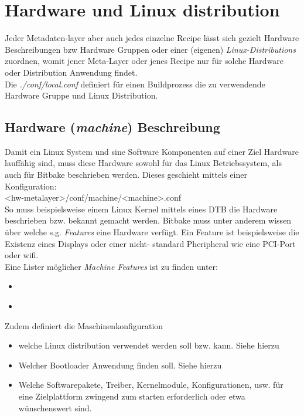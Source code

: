 

\chapter{Hardware und Linux distribution}%
\label{sec:hardware_und_linux_distribution}

Jeder Metadaten-layer aber auch jedes einzelne Recipe lässt sich gezielt
Hardware Beschreibungen bzw Hardware Gruppen oder einer (eigenen)
\textit{Linux-\glspl{Distribution}} zuordnen, womit jener Meta-Layer oder jenes
Recipe nur für solche Hardware oder Distribution Anwendung findet. \\

Die \textit{./conf/local.conf} definiert für einen Buildprozess die zu
verwendende Hardware Gruppe und Linux Distribution.

\section{Hardware (\textit{machine}) Beschreibung}%
\label{sec:hardware_machine_beschreibung}

Damit ein Linux System und sine Software Komponenten auf einer Ziel Hardware
lauffähig sind, muss diese Hardware sowohl für das Linux Betriebssystem, als
auch für Bitbake beschrieben werden. Dieses geschieht mittels
einer Konfiguration: \\
<hw-metalayer>/conf/machine/<machine>.conf
\\
So muss beispielsweise einem Linux Kernel mittels eines \acl{DTB} die Hardware
beschrieben bzw. bekannt gemacht werden. Bitbake muss unter anderem wissen
über welche s.g. \textit{\glspl{Feature}} eine Hardware verfügt.
Ein Feature ist beispielsweise die Existenz eines Displays oder  einer nicht-
standard Pheripheral wie eine PCI-Port oder wifi.  \\

Eine Lister möglicher \textit{Machine Features} ist zu finden unter:
\begin{itemize}
    \item \cite[Abschn. Machine\_Features][]{Yocto:Reference_Manual}
    \item \cite[Abschn. Machine\_Features][]{Yocto:Mega_Manual}
\end{itemize}

Zudem definiert die Maschinenkonfiguration
\begin{itemize}
    \item welche Linux distribution verwendet werden soll bzw. kann. Siehe
        hierzu 
    \item Welcher Bootloader Anwendung finden soll. Siehe hierzu
    \item Welche Softwarepakete, Treiber, Kernelmodule, Konfigurationen, usw.
        für eine Zielplattform zwingend zum starten erforderlich oder etwa
        wünschenswert sind.
\end{itemize}

